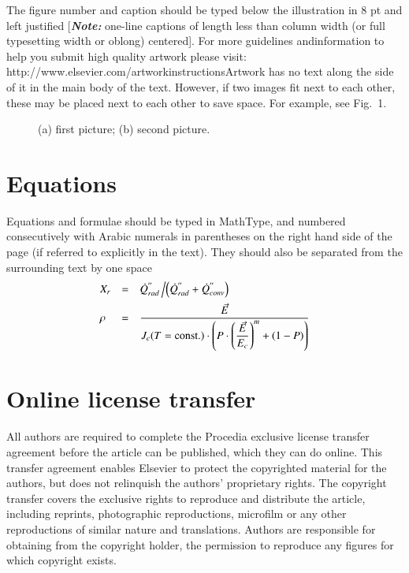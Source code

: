 \documentclass[3p,times,procedia]{elsarticle}
\begin{document}
The figure number and caption should be typed below the illustration in 8 pt and left justified [{\bfseries\itshape Note:} one-line captions of length less than column width (or full typesetting width or oblong) centered]. For more guidelines and\break information to help you submit high quality artwork please visit: http://www.elsevier.com/artworkinstructions\break Artwork has no text along the side of it in the main body of the text. However, if two images fit next to each other, these may be placed next to each other to save space. For example, see Fig.~1.
\begin{figure}[t]\vspace*{4pt}
\caption{(a) first picture; (b) second picture.}
\end{figure}


\section{Equations}
Equations and formulae should be typed in MathType, and numbered consecutively with Arabic numerals in parentheses on the right hand side of the page (if referred to explicitly in the text). They should also be separated from the surrounding text by one space
\begin{equation}
\begin{array}{lcl}
\displaystyle X_r &=& \displaystyle\dot{Q}^{''}_{rad}\left/\left(\dot{Q}^{''}_{rad} + \dot{Q}^{''}_{conv}\right)\right.\\[6pt]
\displaystyle \rho &=& \displaystyle\frac{\vec{E}}{J_c(T={\rm const.})\cdot\left(P\cdot\left(\displaystyle\frac{\vec{E}}{E_c}\right)^m+(1-P)\right)}
\end{array}
\end{equation}


\section{Online license transfer}
All authors are required to complete the Procedia exclusive license transfer agreement before the article can be published, which they can do online. This transfer agreement enables Elsevier to protect the copyrighted material for the authors, but does not relinquish the authors' proprietary rights. The copyright transfer covers the exclusive rights to reproduce and distribute the article, including reprints, photographic reproductions, microfilm or any other reproductions of similar nature and translations. Authors are responsible for obtaining from the copyright holder, the permission to reproduce any figures for which copyright exists.
\end{document}

